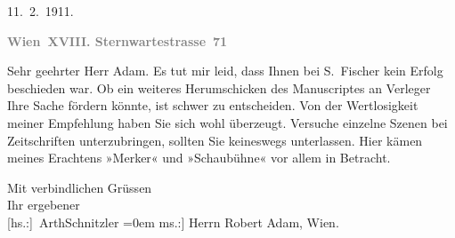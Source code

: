 \pstart
           \raggedleft{}11. 2. 1911.\pend
           \pend
           
\pstart
           \textcolor{gray}{\textbf{Wien XVIII. Sternwartestrasse 71}}\pend
           
\pstart\center{}Sehr geehrter Herr Adam.\pend\vspace{0.5em}
\pstart
           Es tut mir leid, dass Ihnen bei S. Fischer kein
               Erfolg beschieden war. Ob ein weiteres Herumschicken des Manuscriptes an Verleger Ihre Sache fördern
               könnte, ist schwer zu entscheiden. Von der Wertlosigkeit meiner Empfehlung haben Sie
               sich wohl überzeugt. Versuche einzelne Szenen bei Zeitschriften unterzubringen,
               sollten Sie keineswegs unterlassen. Hier kämen meines Erachtens »Merker« und »Schaubühne« vor
               allem in Betracht.\pend
           
\pstart
           Mit verbindlichen Grüssen{\\[\baselineskip]}Ihr ergebener{\\[\baselineskip]}\spacefill\mbox{{[}hs.:{]} ArthSchnitzler}\pend
           \leftskip=0em{}
\pstart
           \noindent{}{[}ms.:{]} Herrn Robert Adam, Wien.\pend
           \endnumbering{}  \newcommand{\dateiname}{L02010}\newcommand{\titel}{Arthur Schnitzler an Robert Adam, 11. 2. 1911}\newcommand{\editorInnen}{Martin Anton Müller und Gerd-Hermann Susen}
